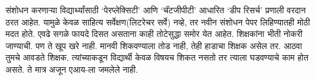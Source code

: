 संशोधन करणाऱ्या विद्यार्थ्यांसाठी `पेरप्लेक्सिटी' आणि `चॅटजीपीटी' आधारित `डीप रिसर्च' प्रणाली वरदान ठरत आहेत. यामुळे केवळ साहित्य सर्वेक्षण(लिटरेचर सर्वे) नव्हे, तर नवीन संशोधन पेपर लिहिण्यातही मोठी मदत होते. एवढे सगळे फायदे दिसत असताना काही तोटेसुद्धा समोर येत आहेत. शिक्षकांना भीती नोकरी जाण्याची. पण ते खूप खरे नाही. मानवी शिकवण्याला तोड नाही, तेही हाडाचा शिक्षक असेल तर. आठवा तुमचे आवडते शिक्षक. त्यांच्याकडून विद्यार्थी केवळ विषयच शिकत नसतो तर त्याला घडवण्याचे काम होत असते. ते मात्र अजून एआय-ला जमलेले नाही.